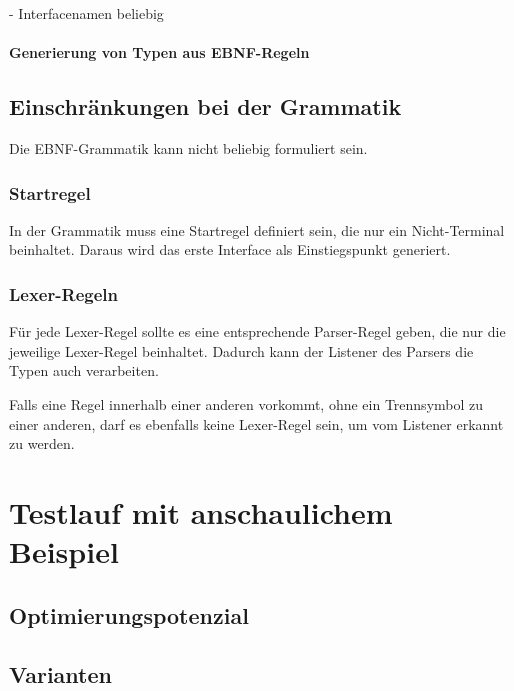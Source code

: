 \documentclass[../InterneDSLs.tex]{subfiles}
\begin{document}
- Interfacenamen beliebig

\subsubsection{Generierung von Typen aus EBNF-Regeln}


\section{Einschränkungen bei der Grammatik}
Die EBNF-Grammatik kann nicht beliebig formuliert sein.

\subsection{Startregel}
In der Grammatik muss eine Startregel definiert sein, die nur ein Nicht-Terminal beinhaltet. Daraus wird das erste Interface als Einstiegspunkt generiert.

\subsection{Lexer-Regeln}
Für jede Lexer-Regel sollte es eine entsprechende Parser-Regel geben, die nur die jeweilige Lexer-Regel beinhaltet. Dadurch kann der Listener des Parsers die Typen auch verarbeiten.

Falls eine Regel innerhalb einer anderen vorkommt, ohne ein Trennsymbol zu einer anderen, darf es ebenfalls keine Lexer-Regel sein, um vom Listener erkannt zu werden.


\chapter{Testlauf mit anschaulichem Beispiel}


\section{Optimierungspotenzial}


\section{Varianten}
\end{document}

